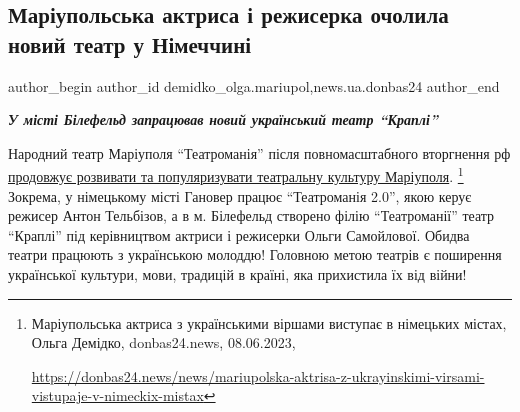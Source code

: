  
 
 
 
 
 
\subsection{Маріупольська актриса і режисерка очолила новий театр у Німеччині}
\label{sec:27_06_2023.stz.news.ua.donbas24.1.mariupol_aktrisa_rezhiserka_teatr_bielefeld_krapli}
 
\ifcmt
 author_begin
   author_id demidko_olga.mariupol,news.ua.donbas24
 author_end
\fi



\begin{center}
  \em\color{blue}\bfseries\Large
  У місті Білефельд запрацював новий український театр \enquote{Краплі} 
\end{center}

Народний театр Маріуполя \enquote{Театроманія} після повномасштабного
вторгнення рф
\href{https://donbas24.news/news/mariupolska-aktrisa-z-ukrayinskimi-virsami-vistupaje-v-nimeckix-mistax}{продовжує
розвивати та популяризувати театральну культуру Маріуполя}.%
\footnote{Маріупольська актриса з українськими віршами виступає в німецьких містах, Ольга Демідко, donbas24.news, 08.06.2023, \par\url{https://donbas24.news/news/mariupolska-aktrisa-z-ukrayinskimi-virsami-vistupaje-v-nimeckix-mistax}}
Зокрема, у німецькому місті Гановер працює \enquote{Театроманія 2.0}, якою керує режисер
Антон Тельбізов, а в м. Білефельд створено філію \enquote{Театроманії} театр
\enquote{Краплі} під керівництвом актриси і режисерки Ольги Самойлової. Обидва
театри працюють з українською молоддю! Головною метою театрів є поширення
української культури, мови, традицій в країні, яка прихистила їх від війни!

